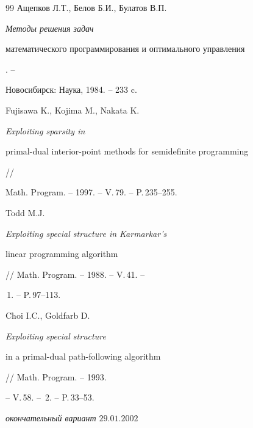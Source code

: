 \begin{thebibliography}{99}
Ащепков Л.Т., Белов Б.И., Булатов В.П. {\em Методы решения задач


математического программирования и оптимального управления}. --


Новосибирск: Наука, 1984. -- 233 c.







Fujisawa K., Kojima M., Nakata K. {\em Exploiting sparsity in


primal-dual interior-point methods for semidefinite programming} //


Math. Program. -- 1997. -- V.\,79. -- P.\,235--255.







Todd M.J. {\em Exploiting special structure in Karmarkar's


linear programming algorithm} // Math. Program. -- 1988. -- V.\,41. --


\No\,1. -- P.\,97--113.







Choi I.C., Goldfarb D. {\em Exploiting special structure


in a primal-dual path-following algorithm} // Math. Program. -- 1993.


-- V.\,58. -- \No\,2. -- P.\,33--53.





\end{thebibliography}





\vskip 2cm











{\it окончательный вариант $29.01.2002$}





\label{end}





